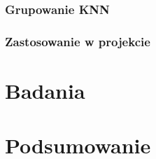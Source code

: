 \documentclass[a4paper,twoside,12pt]{book}
\newcounter{stronyPozaNumeracja}
\begin{document}
    \subsection{Grupowanie KNN}
    \subsection{Zastosowanie w projekcie}
    \chapter{Badania}

    \chapter{Podsumowanie}



    \backmatter
    \setcounter{page}{\value{stronyPozaNumeracja}}

    \pagestyle{tylkoNumeryStron}

    
    

\end{document}
